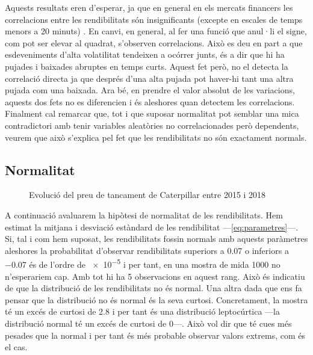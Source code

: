 \documentclass{article}
\numberwithin{table}{section}
\numberwithin{figure}{section}
\numberwithin{equation}{section}
\begin{document}
Aquests resultats eren d'esperar, ja que en general en els mercats financers les correlacions entre les rendibilitats són insignificants (excepte en escales de temps menors a 20 minuts) \cite{20}.
En canvi, en general, al fer una funció que anul·li el signe, com pot ser elevar al quadrat, s’observen correlacions. Això es deu en part a que esdeveniments d’alta volatilitat tendeixen a ocórrer junts, és a dir que hi ha pujades i baixades abruptes en temps curts. Aquest fet però, no el detecta la correlació directa ja que després d’una alta pujada pot haver-hi tant una altra pujada com una baixada. Ara bé, en prendre el valor absolut de les variacions, aquests dos fets no es diferencien i és aleshores quan detectem les correlacions.
Finalment cal remarcar que, tot i que suposar normalitat pot semblar una mica contradictori amb tenir variables aleatòries no correlacionades però dependents, veurem que això s’explica pel fet que les rendibilitats no són exactament normals.

\subsection{Normalitat}
\begin{figure}[H]
	\centering \sffamily \small
	
	\caption{Evolució del preu de tancament de Caterpillar entre 2015 i 2018}
	\label{fig:distribucio rendibilitats}
\end{figure}
A continuació avaluarem la hipòtesi de normalitat de les rendibilitats. Hem estimat la mitjana i desviació estàndard de les rendibilitat ---\cref{eq:parametres}---. Si, tal i com hem suposat, les rendibilitats fossin normals amb aquests paràmetres aleshores la probabilitat d'observar rendibilitats superiors a \num{0.07} o inferiors a \num{-0.07} és de l'ordre de \num{e-5} i per tant, en una mostra de mida 1000 no n'esperariem cap. Amb tot hi ha 5 observacions en aquest rang. Això és indicatiu de que la distribució de les rendibilitats no és normal. Una altra dada que ens fa pensar que la distribució no és normal és la seva curtosi. Concretament, la mostra té un excés de curtosi de \num{2.8} i per tant és una distribució leptocúrtica ---la distribució normal té un excés de curtosi de 0---. Això vol dir que té cues més pesades que la normal i per tant és més probable observar valors extrems, com és el cas. 
\end{document}
